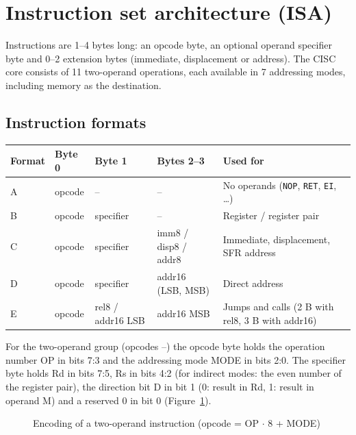 \section{Instruction set architecture (ISA)}
\label{sec:isa}

Instructions are 1--4 bytes long: an opcode byte, an optional operand
specifier byte and 0--2 extension bytes (immediate, displacement or address).
The CISC core consists of 11 two-operand operations, each available in 7
addressing modes, including memory as the destination.

\subsection{Instruction formats}

\begin{center}
\small
\begin{tabularx}{\linewidth}{@{}l l l l X@{}}
  \toprule
  \textbf{Format} & \textbf{Byte 0} & \textbf{Byte 1} & \textbf{Bytes 2--3} & \textbf{Used for} \\
  \midrule
  A & opcode & --        & --                        & No operands (\texttt{NOP}, \texttt{RET}, \texttt{EI}, \ldots) \\
  B & opcode & specifier & --                        & Register / register pair \\
  C & opcode & specifier & imm8 / disp8 / addr8      & Immediate, displacement, SFR address \\
  D & opcode & specifier & addr16 (LSB, MSB)         & Direct address \\
  E & opcode & rel8 / addr16 LSB & addr16 MSB       & Jumps and calls (2 B with rel8, 3 B with addr16) \\
  \bottomrule
\end{tabularx}
\end{center}

For the two-operand group (opcodes --) the opcode byte holds the
operation number OP in bits 7:3 and the addressing mode MODE in bits 2:0. The
specifier byte holds Rd in bits 7:5, Rs in bits 4:2 (for indirect modes: the
even number of the register pair), the direction bit D in bit 1
(0: result in Rd, 1: result in operand M) and a reserved 0 in bit 0
(Figure~\ref{fig:format}).

\begin{figure}[htbp]
  \centering
  
  \caption{Encoding of a two-operand instruction (opcode = OP $\cdot$ 8 + MODE)}
  \label{fig:format}
\end{figure}

